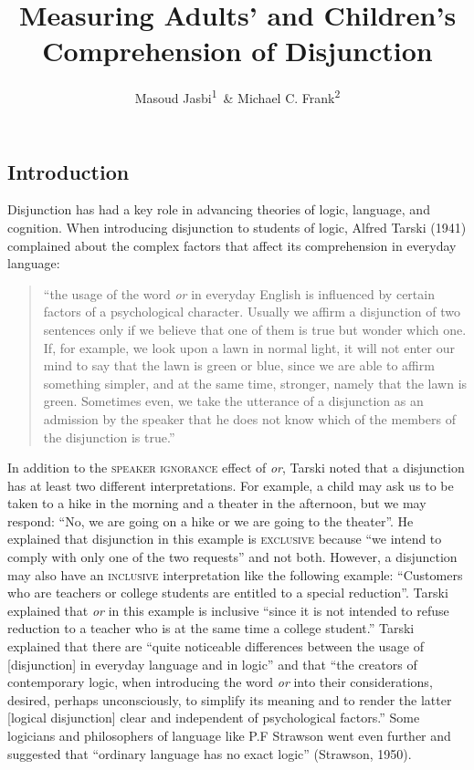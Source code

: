 \documentclass[floatsintext,man]{apa6}
\title{Measuring Adults' and Children's Comprehension of Disjunction}
\author{Masoud Jasbi\textsuperscript{1}~\& Michael C. Frank\textsuperscript{2}}
\affiliation{
    \vspace{0.5cm}
          \textsuperscript{1} Harvard University\\
          \textsuperscript{2} Stanford University  }
\theoremstyle{definition}
\theoremstyle{definition}
\theoremstyle{definition}
\theoremstyle{remark}
\begin{document}
\maketitle

\setcounter{secnumdepth}{0}



\subsection{Introduction}\label{introduction}

Disjunction has had a key role in advancing theories of logic, language,
and cognition. When introducing disjunction to students of logic, Alfred
Tarski (1941) complained about the complex factors that affect its
comprehension in everyday language:

\begin{quote}
\enquote{the usage of the word \emph{or} in everyday English is
influenced by certain factors of a psychological character. Usually we
affirm a disjunction of two sentences only if we believe that one of
them is true but wonder which one. If, for example, we look upon a lawn
in normal light, it will not enter our mind to say that the lawn is
green or blue, since we are able to affirm something simpler, and at the
same time, stronger, namely that the lawn is green. Sometimes even, we
take the utterance of a disjunction as an admission by the speaker that
he does not know which of the members of the disjunction is true.}
\end{quote}

In addition to the \textsc{speaker ignorance} effect of \emph{or},
Tarski noted that a disjunction has at least two different
interpretations. For example, a child may ask us to be taken to a hike
in the morning and a theater in the afternoon, but we may respond:
\enquote{No, we are going on a hike or we are going to the theater}. He
explained that disjunction in this example is \textsc{exclusive} because
\enquote{we intend to comply with only one of the two requests} and not
both. However, a disjunction may also have an \textsc{inclusive}
interpretation like the following example: \enquote{Customers who are
teachers or college students are entitled to a special reduction}.
Tarski explained that \emph{or} in this example is inclusive
\enquote{since it is not intended to refuse reduction to a teacher who
is at the same time a college student.} Tarski explained that there are
\enquote{quite noticeable differences between the usage of
{[}disjunction{]} in everyday language and in logic} and that
\enquote{the creators of contemporary logic, when introducing the word
\emph{or} into their considerations, desired, perhaps unconsciously, to
simplify its meaning and to render the latter {[}logical disjunction{]}
clear and independent of psychological factors.} Some logicians and
philosophers of language like P.F Strawson went even further and
suggested that \enquote{ordinary language has no exact logic} (Strawson,
1950).
\end{document}

